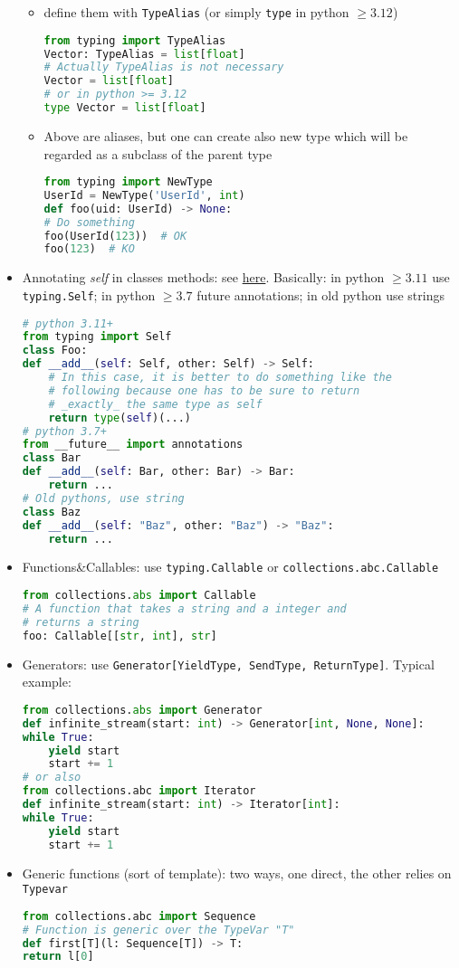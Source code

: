 \documentclass[a4paper,12pt,%
              final%
              ]{article}
\begin{document}
\begin{itemize}
    \begin{itemize}
      \item define them with \texttt{TypeAlias} (or simply \texttt{type} in python $\geq3.12$)
\begin{lstlisting}[language=python]
from typing import TypeAlias
Vector: TypeAlias = list[float]
# Actually TypeAlias is not necessary
Vector = list[float]
# or in python >= 3.12
type Vector = list[float]
\end{lstlisting}
      \item Above are aliases, but one can create also new type which will be regarded as a subclass of the parent type
\begin{lstlisting}[language=python]
from typing import NewType
UserId = NewType('UserId', int)
def foo(uid: UserId) -> None:
# Do something
foo(UserId(123))  # OK
foo(123)  # KO
\end{lstlisting}
    \end{itemize}
  \item Annotating \emph{self} in classes methods: see \href{https://stackoverflow.com/a/33533514}{here}. Basically: in python $\geq3.11$ use \texttt{typing.Self}; in python $\geq3.7$ future annotations; in old python use strings
\begin{lstlisting}[language=python]
# python 3.11+
from typing import Self
class Foo:
def __add__(self: Self, other: Self) -> Self:
    # In this case, it is better to do something like the
    # following because one has to be sure to return
    # _exactly_ the same type as self
    return type(self)(...)
# python 3.7+
from __future__ import annotations
class Bar
def __add__(self: Bar, other: Bar) -> Bar:
    return ...
# Old pythons, use string
class Baz
def __add__(self: "Baz", other: "Baz") -> "Baz":
    return ...
\end{lstlisting}
  \item Functions\&Callables: use \texttt{typing.Callable} or \texttt{collections.abc.Callable}
\begin{lstlisting}[language=python]
from collections.abs import Callable
# A function that takes a string and a integer and
# returns a string
foo: Callable[[str, int], str]
\end{lstlisting}
  \item Generators: use \verb|Generator[YieldType, SendType, ReturnType]|. Typical example:
\begin{lstlisting}[language=python]
from collections.abs import Generator
def infinite_stream(start: int) -> Generator[int, None, None]:
while True:
    yield start
    start += 1
# or also
from collections.abc import Iterator
def infinite_stream(start: int) -> Iterator[int]:
while True:
    yield start
    start += 1
\end{lstlisting}
  \item Generic functions (sort of template): two ways, one direct, the other relies on \texttt{Typevar}
\begin{lstlisting}[language=python]
from collections.abc import Sequence
# Function is generic over the TypeVar "T"
def first[T](l: Sequence[T]) -> T:
return l[0]


\end{lstlisting}
\end{itemize}
\end{document}
